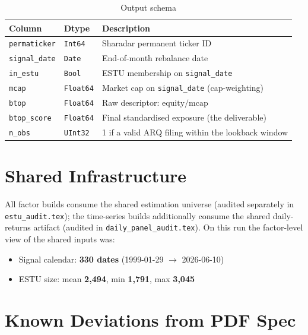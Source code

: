\documentclass[11pt,a4paper]{article}
\begin{document}
\begin{table}[h!]
\centering
\caption{Output schema}
\begin{tabular}{llp{7.4cm}}
\toprule
\textbf{Column} & \textbf{Dtype} & \textbf{Description} \\
\midrule
\texttt{permaticker} & \texttt{Int64} & Sharadar permanent ticker ID \\
\texttt{signal\_date} & \texttt{Date} & End-of-month rebalance date \\
\texttt{in\_estu} & \texttt{Bool} & ESTU membership on \texttt{signal\_date} \\
\texttt{mcap} & \texttt{Float64} & Market cap on \texttt{signal\_date} (cap-weighting) \\
\texttt{btop} & \texttt{Float64} & Raw descriptor: $\text{equity}/\text{mcap}$ \\
\texttt{btop\_score} & \texttt{Float64} & Final standardised exposure (the deliverable) \\
\texttt{n\_obs} & \texttt{UInt32} & 1 if a valid ARQ filing within the lookback window \\
\bottomrule
\end{tabular}
\end{table}

\section{Shared Infrastructure}

All factor builds consume the shared estimation universe
 (audited separately in
\texttt{estu\_audit.tex}); the time-series builds additionally consume the
shared daily-returns artifact (audited in \texttt{daily\_panel\_audit.tex}).
On this run the factor-level view of the shared inputs was:

\begin{itemize}[leftmargin=*,topsep=2pt,itemsep=2pt]
  \item Signal calendar: \textbf{330 dates} (1999-01-29 $\to$ 2026-06-10)
  \item ESTU size: mean \textbf{2{,}494}, min \textbf{1{,}791}, max \textbf{3{,}045}
\end{itemize}

\section{Known Deviations from PDF Spec}
\end{document}
